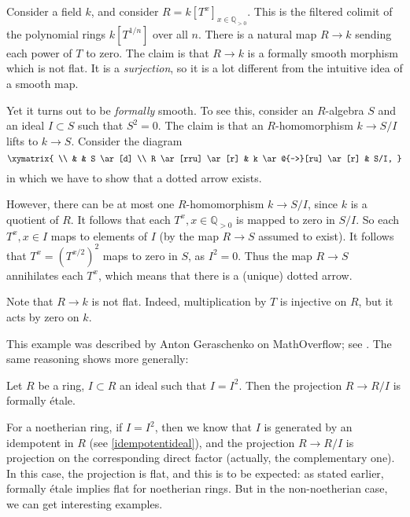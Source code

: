 \begin{example} \label{fsisn'tflat}
Consider a field $k$, and consider $R = k[T^{x}]_{x \in \mathbb{Q}_{>0}}$. 
This is the filtered colimit of the polynomial rings $k[T^{1/n}]$ over all $n$. There is a
natural map $R \to k$ sending each power of $T$ to zero.
The claim is that $R \to k$ is a formally smooth morphism which is not flat.
It is a \emph{surjection}, so it is a lot different from the intuitive idea of
a smooth map.

Yet it turns out to be \emph{formally} smooth. To see this, consider an $R$-algebra $S$ and an ideal $I \subset S$ such that $S^2 =
0$. The claim is that an $R$-homomorphism $k \to S/I$ lifts to $k \to S$.
Consider the diagram
\[ \xymatrix{ \\
& & S \ar[d]  \\
R  \ar[rru] \ar[r] & k \ar@{-->}[ru] \ar[r] & S/I,
}\]
in which we have to show that a dotted arrow exists.

However, there can be at most one $R$-homomorphism $k \to S/I$, since $k$ is a
quotient of $R$. It follows that each $T^{x}, x \in \mathbb{Q}_{>0}$ is mapped
to zero in $S/I$.
So each $T^x, x \in I$ maps to elements of $I$ (by the map $R \to S$ assumed to
exist). It follows that $T^x = (T^{x/2})^2$ maps to zero in $S$, as $I^2 =0$.
Thus the map $R \to S$ annihilates each $T^x$, which means that there is a
(unique) dotted arrow.

Note that $R \to k$ is not flat. Indeed, multiplication by $T$ is injective on
$R$, but it acts by zero on $k$.
\end{example} 

This example was described by Anton Geraschenko on MathOverflow; see
\cite{MO200}.
The same reasoning shows more generally:

\begin{proposition} 
Let $R$ be a ring, $I \subset R$ an ideal such that $I = I^2$. Then the
projection $R \to R/I$ is formally \'etale.
\end{proposition} 

For a noetherian ring, if $I = I^2$, then we know that $I$ is generated by an
idempotent in $R$ (see \cref{idempotentideal}), and the projection $R \to R/I$ is projection on the
corresponding direct factor (actually, the complementary one).
In this case, the projection is flat, and this is to be expected: as stated
earlier, formally \'etale implies flat for noetherian rings.
But in the non-noetherian case, we can get interesting examples. 


